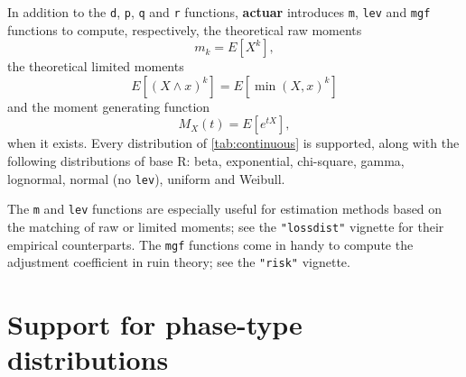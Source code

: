 \documentclass[x11names]{article}
\newcommand{\E}[1]{E[ #1 ]}
\newcommand{\proglang}[1]{\textsf{#1}}
\newcommand{\pkg}[1]{\textbf{#1}}
\newcommand{\code}[1]{\texttt{#1}}
\begin{document}
In addition to the \code{d}, \code{p}, \code{q} and \code{r}
functions, \pkg{actuar} introduces \code{m}, \code{lev} and \code{mgf}
functions to compute, respectively, the theoretical raw moments
\begin{equation*}
  m_k = \E{X^k},
\end{equation*}
the theoretical limited moments
\begin{equation*}
  \E{(X \wedge x)^k} = \E{\min(X, x)^k}
\end{equation*}
and the moment generating function
\begin{equation*}
  M_X(t) = \E{e^{tX}},
\end{equation*}
when it exists. Every distribution of \autoref{tab:continuous} is
supported, along with the following distributions of base
\proglang{R}: beta, exponential, chi-square, gamma, lognormal, normal
(no \code{lev}), uniform and Weibull.

The \code{m} and \code{lev} functions are especially useful for
estimation methods based on the matching of raw or limited moments;
see the \code{"lossdist"} vignette for their empirical counterparts.
The \code{mgf} functions come in handy to compute the adjustment
coefficient in ruin theory; see the \code{"risk"} vignette.



\section{Support for phase-type distributions}
\label{sec:phase-type}
\end{document}
